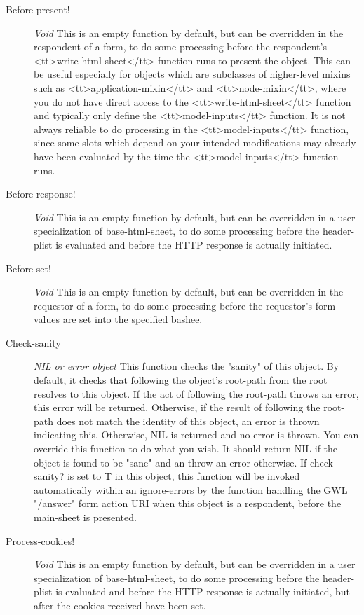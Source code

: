 \documentclass [11pt]{book}
\begin{document}
\begin{itemize}
\begin{description}
\item [Before-present!]
\emph{Void} This is an empty function by default, but can be overridden in
the respondent of a form, to do some processing before the respondent's
<tt>write-html-sheet</tt> function runs to present the object. This can be
useful especially for objects which are subclasses of higher-level mixins such as
<tt>application-mixin</tt> and <tt>node-mixin</tt>, where you do not have
direct access to the <tt>write-html-sheet</tt> function and typically only define
the <tt>model-inputs</tt> function. It is not always reliable to do processing
in the <tt>model-inputs</tt> function, since some slots which depend on your
intended modifications may already have been evaluated by the time the
<tt>model-inputs</tt> function runs.


\item [Before-response!]
\emph{Void} This is an empty function by default, but can be overridden in
a user specialization of base-html-sheet, to do some processing before the
header-plist is evaluated and before the HTTP response is actually initiated.


\item [Before-set!]
\emph{Void} This is an empty function by default, but can be overridden in
the requestor of a form, to do some processing before the requestor's form
values are set into the specified bashee.


\item [Check-sanity]
\emph{NIL or error object} This function checks the "sanity" of this object. By
default, it checks that following the object's root-path from the root resolves
to this object. If the act of following the root-path throws an error, this error
will be returned. Otherwise, if the result of following the root-path does not
match the identity of this object, an error is thrown indicating this. Otherwise,
NIL is returned and no error is thrown. You can override this function to do what
you wish. It should return NIL if the object is found to be "sane" and an throw
an error otherwise.
If check-sanity? is set to T in this object, this function will be invoked automatically
within an ignore-errors by the function handling the GWL "/answer" form action URI
when this object is a respondent, before the main-sheet is presented.


\item [Process-cookies!]
\emph{Void} This is an empty function by default, but can be overridden in
a user specialization of base-html-sheet, to do some processing before the
header-plist is evaluated and before the HTTP response is actually initiated, but after
the cookies-received have been set.



\end{description}
\end{itemize}
\end{document}
